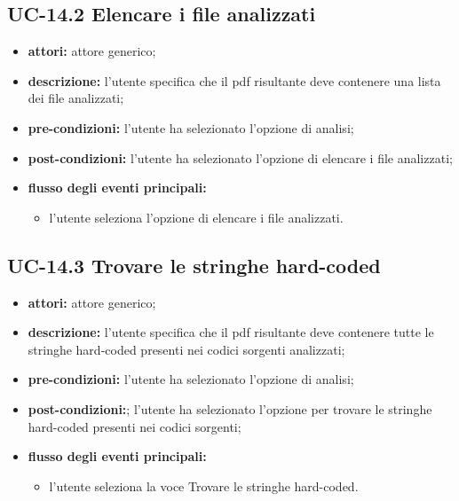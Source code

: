\subsection*{UC-14.2 Elencare i file analizzati}
\begin{itemize}
    \item \textbf{attori:} attore generico;
    \item \textbf{descrizione:} l'utente specifica che il pdf risultante deve contenere una lista dei file analizzati;
    \item \textbf{pre-condizioni:} l'utente ha selezionato l'opzione di analisi;
    \item \textbf{post-condizioni:} l'utente ha selezionato l'opzione di elencare i file analizzati;
    \item \textbf{flusso degli eventi principali:}
    \begin{itemize}
        \item l'utente seleziona l'opzione di elencare i file analizzati.
    \end{itemize}
\end{itemize}
\subsection*{UC-14.3 Trovare le stringhe hard-coded}
\begin{itemize}
    \item \textbf{attori:} attore generico;
    \item \textbf{descrizione:} l'utente specifica che il pdf risultante deve contenere tutte le stringhe hard-coded presenti nei codici sorgenti analizzati;
    \item \textbf{pre-condizioni:} l'utente ha selezionato l'opzione di analisi;
    \item \textbf{post-condizioni:}; l'utente ha selezionato l'opzione per trovare le stringhe hard-coded presenti nei codici sorgenti;
    \item \textbf{flusso degli eventi principali:}
    \begin{itemize}
        \item l'utente seleziona la voce Trovare le stringhe hard-coded.
    \end{itemize}
\end{itemize}
